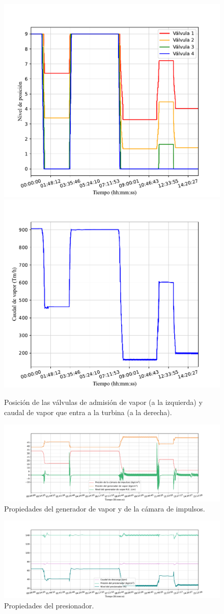 \begin{figure}[!h]
  \includegraphics[width=0.5\linewidth]{content/figures/sim4_valvulas_control.pdf} 
  \includegraphics[width=0.5\linewidth]{content/figures/sim4_vapor.pdf}
  \caption{Posición de las válvulas de admisión de vapor (a la izquierda) y caudal de vapor que entra a la turbina (a la derecha).}
  \label{fig:sim4_valvulas_vapor}
\end{figure}

\begin{figure}[!h]
  \centering
  \includegraphics[width=\textwidth]{content/figures/sim4_gen_vapor_camara_imp.pdf}
  \caption{Propiedades del generador de vapor y de la cámara de impulsos.}
  \label{fig:sim4_gen_vapor_camara_imp}
\end{figure}

\begin{figure}[!h]
  \centering
  \includegraphics[width=\textwidth]{content/figures/sim4_presionador.pdf}
  \caption{Propiedades del presionador.}
  \label{fig:sim4_presionador}
\end{figure}